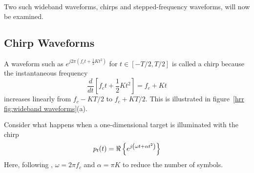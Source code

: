 Two such wideband waveforms, chirps and stepped-frequency waveforms, will
now be examined.

\subsection{Chirp Waveforms}

A waveform such as $e^{j2\pi(f_ct+\frac{1}{2}Kt^2)}$ for 
$t\in[-T/2,T/2]$ is called a chirp \cite{Kla60} because the instantaneous 
frequency
\begin{equation}
\frac{d}{dt}\left[f_ct+{\textstyle\frac{1}{2}}Kt^2\right]=f_c+Kt
\end{equation}
increases linearly from $f_c-KT/2$ to $f_c+KT/2$.  This is illustrated in
figure~\ref{hrr fig:wideband waveforms}(a).  

Consider what happens when a one-dimensional target is illuminated with the 
chirp
\begin{equation}\label{hrr eqn:chirp pt(t)}
p_t(t)=\Re\left\{e^{j\left(\omega t+\alpha t^2\right)}\right\}
\end{equation}
Here, following \cite{Mun83}, $\omega=2\pi f_c$ and $\alpha=\pi K$ 
to reduce the number of symbols.

